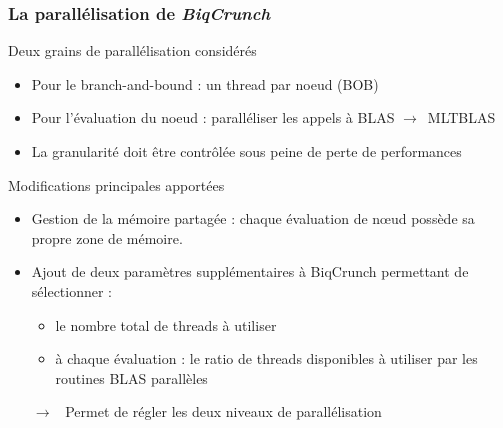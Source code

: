 \documentclass{beamer}
\newcommand{\fleche}{\alert{$\pmb{\longrightarrow}$}~}
\def\bleu#1{{\color{blue}#1}}
\newcommand{\biqcrunch}{\emph{\mbox{BiqCrunch}}}
\begin{document}
\begin{frame}
\frametitle{La parallélisation de \biqcrunch}

\begin{block}{Deux grains de parallélisation considérés}
\begin{itemize}
\item Pour le branch-and-bound : un thread par noeud (BOB)
\item Pour l'évaluation du noeud : paralléliser les appels à BLAS \fleche MLTBLAS
\item \alert{La granularité doit être contrôlée} sous peine de perte de performances
\end{itemize}
\end{block}

\begin{block}{Modifications principales apportées}
\begin{itemize}
\item Gestion de la mémoire partagée : chaque évaluation de n\oe ud possède sa propre zone de mémoire.
\item \alert{Ajout de deux paramètres supplémentaires} à BiqCrunch permettant de sélectionner :
\begin{itemize}
\item  le \bleu{nombre total de threads} à utiliser
\item  à chaque évaluation : le \bleu{ratio de threads disponibles} à utiliser par les routines BLAS parallèles 
\end{itemize}
\alert{\fleche} Permet de régler les deux niveaux de parallélisation
\end{itemize}
\end{block}
\end{frame}

\end{document}
